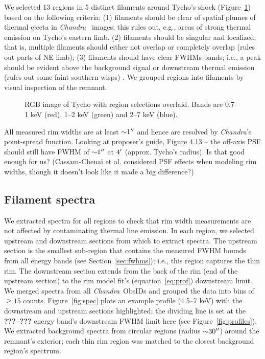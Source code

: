 \documentclass[iop, apj, numberedappendix, twocolappendix]{emulateapj}
\newcommand*{\abt}{\mathord{\sim}} %
\newcommand*{\Chandra}{\textit{Chandra}\ }
\begin{document}
We selected 13 regions in 5 distinct filaments around Tycho's shock
(Figure~\ref{fig:snr}) based on the following criteria:
(1) filaments should be clear of spatial plumes of thermal ejecta in \Chandra
images; this rules out, e.g., areas of strong thermal emission on Tycho's eastern limb.
(2) filaments should be singular and localized; that is, multiple filaments
should either not overlap or completely overlap (rules out parts of NE limb);
(3) filaments should have clear FWHMs bands; i.e., a peak should be evident
above the background signal or downstream thermal emission (rules out some
faint southern wisps) .
We grouped regions into filaments by visual inspection of the remnant.

\begin{figure}
    \centering
    \caption{RGB image of Tycho with region selections overlaid.  Bands are
    0.7--1 keV (red), 1--2 keV (green) and 2--7 keV (blue).
    }
    \label{fig:snr}
\end{figure}

All measured rim widths are at least $\abt 1\arcsec$ and hence are resolved by
\textit{Chandra}'s point-spread function.
Looking at proposer's guide, Figure 4.13 -- the off-axis PSF should
still have FWHM of $\abt 1\arcsec$ at $4\mbox{$^\prime$}$ (approx. Tycho's radius).
Is that good enough for us?
(Cassam-Chena\"i et al. considered PSF effects when modeling rim widths, though
it doesn't look like it made a big difference?)

\subsection{Filament spectra}
\label{sec:spec}

We extracted spectra for all regions to check that rim width measurements are
not affected by contaminating thermal line emission.  In each region, we
selected upstream and downstream sections from which to extract spectra.  The
upstream section is the smallest sub-region that contains the measured FWHM
bounds from all energy bands (see Section~\ref{sec:fwhms}); i.e., this region
captures the thin rim.  The downstream section extends from the back of the rim
(end of the upstream section) to the rim model fit's (equation~\eqref{eq:prof})
downstream limit.  We merged spectra from all \Chandra ObsIDs and grouped the
data into bins of $\geq 15$ counts.  Figure~\ref{fig:spec} plots an example
profile (4.5--7 keV) with the downstream and upstream sections highlighted; the
dividing line is set at the \textbf{???--???} energy band's downstream FWHM
limit here (see Figure~\ref{fig:profiles}).
We extracted background spectra from circular regions (radius $\abt 30\arcsec$)
around the remnant's exterior; each thin rim region was matched to the closest
background region's spectrum.
\end{document}
